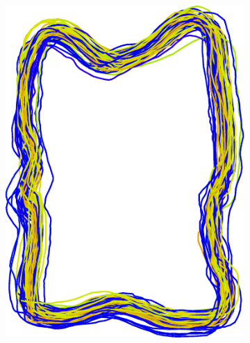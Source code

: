 \documentclass[pdftex,12pt,a4paper]{report}
\begin{document}
\begin{figure}[h]
	\centering
	\begin{subfigure}[b]{0.34\textwidth}
		\centering
		\includegraphics[width=.9\linewidth]{img/registration/unregistered.pdf}
	\end{subfigure}
	\hspace{0.1\textwidth}%
	\begin{subfigure}[b]{0.34\textwidth}
		\centering

\end{subfigure}
\end{figure}
\end{document}

